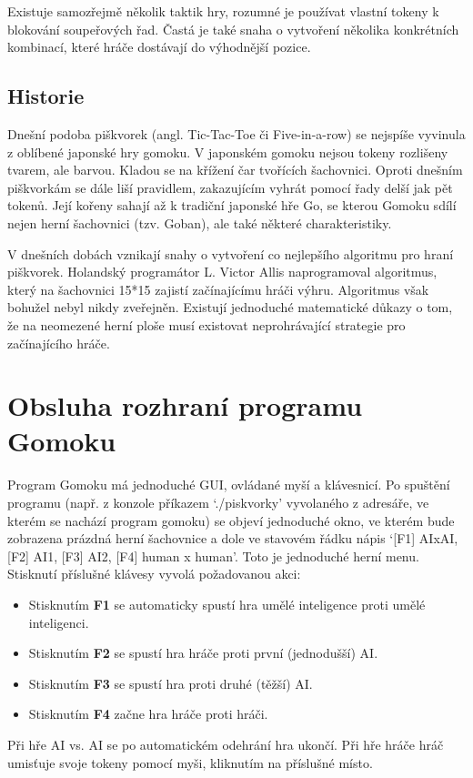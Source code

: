 \documentclass[a4paper,11pt,titlepage]{article}
\begin{document}
Existuje samozřejmě několik taktik hry, rozumné je používat vlastní tokeny k blokování soupeřových řad. Častá je také snaha o vytvoření několika konkrétních kombinací, které hráče dostávají do výhodnější pozice.
\subsection{Historie}
Dnešní podoba piškvorek (angl. Tic-Tac-Toe či Five-in-a-row) se nejspíše vyvinula z oblíbené japonské hry gomoku. V japonském gomoku nejsou tokeny rozlišeny tvarem, ale barvou. Kladou se na křížení čar tvořících šachovnici. Oproti dnešním piškvorkám se dále liší pravidlem, zakazujícím vyhrát pomocí řady delší jak pět tokenů. Její kořeny sahají až k tradiční japonské hře Go, se kterou Gomoku sdílí nejen herní šachovnici (tzv. Goban), ale také některé charakteristiky.

V dnešních dobách vznikají snahy o vytvoření co nejlepšího algoritmu pro hraní piškvorek. Holandský programátor L. Victor Allis naprogramoval algoritmus, který na šachovnici 15*15 zajistí začínajícímu hráči výhru. Algoritmus však bohužel nebyl nikdy zveřejněn. Existují jednoduché matematické důkazy o tom, že na neomezené herní ploše musí existovat neprohrávající strategie pro začínajícího hráče.
\newpage
\section{Obsluha rozhraní programu Gomoku}
Program Gomoku má jednoduché GUI, ovládané myší a klávesnicí. Po spu\-ště\-ní programu (např. z konzole příkazem `./piskvorky' vyvolaného z adresáře, ve kterém se nachází program gomoku) se objeví jednoduché okno, ve kterém bude zobrazena prázdná herní šachovnice a dole ve stavovém řádku nápis `[F1] AIxAI, [F2] AI1, [F3] AI2, [F4] human x human'. Toto je jednoduché herní menu. Stisknutí příslušné klávesy vyvolá požadovanou akci: 
\begin{itemize} 
\item Stisknutím {\bf F1} se automaticky spustí hra umělé inteligence proti umělé inteligenci. 
\item Stisknutím {\bf F2} se spustí hra hráče proti první (jednodušší) AI. 
\item Stisknutím {\bf F3} se spustí hra proti druhé (těžší) AI. 
\item Stisknutím {\bf F4} začne hra hráče proti hráči.
\end{itemize}
Při hře AI vs. AI se po automatickém odehrání hra ukončí. Při hře hráče hráč umisťuje svoje tokeny pomocí myši, kliknutím na příslušné místo.
\end{document}
